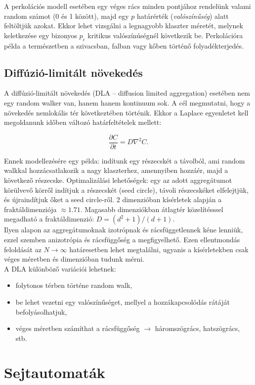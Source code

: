 \documentclass[12pt]{article}
\theoremstyle{plain}
\begin{document}
A perkolációs modell esetében egy véges rács minden pontjához rendelünk valami random számot (0 és 1 között), majd  egy $p$ határérték (\textit{valószínűség}) alatt feltöltjük azokat. Ekkor lehet vizsgálni a legnagyobb klaszter méretét, melynek keletkezése egy bizonyos $p_c$ kritikus valószínúségnél következik be. Perkolációra példa a természetben a szivacsban, falban vagy kőben történő folyadékterjedés. 

\subsection{Diffúzió-limitált növekedés}
A diffúzió-limitált növekedés (DLA -- diffusion limited aggregation) esetében nem egy random walker van, hanem hanem kontinuum sok. A cél megmutatni, hogy a növekedés nemlokális tér következtében történik. Ekkor a Laplace egyenletet kell megoldanunk időben változó határfeltételek mellett:

\begin{equation}
\frac{\partial C}{\partial t} = D \nabla^2 C.
\end{equation}

Ennek modellezésére egy példa: indítunk egy részecskét a távolból, ami random walkkal hozzácsatlakozik a nagy klaszterhez, amennyiben hozzáér, majd a következő részecske. Optimalizálási lehetőségek: egy az adott aggregátumot körülvevő körről indítjuk a részecskét (seed circle), távoli részecskéket elfelejtjük, és újraindítjuk őket a seed circle-ről. 2 dimenzióban kísérletek alapján a fraktáldimenziója $\approx 1.71$. Magasabb dimenziókban átlagtér közelítésssel megadható a fraktáldimenzió: $D = \left(d^2 + 1 \right)/\left( d+1\right)$. \\

Ilyen alapon az aggregátumoknak izotrópnak és rácsfüggetlennek kéne lenniük, ezzel szemben anizotrópia és rácsfüggőség a megfigyelhető. Ezen ellentmondás feloldását az $N \rightarrow \infty$ határesetben lehet megtalálni, ugyanis a kísérletekben csak véges méretben és dimenzióban tudunk mérni. \\

A DLA különböző variációi lehetnek:

\begin{itemize}
\item folytonos térben történe random walk,
\item be lehet vezetni egy valószínűséget, mellyel a hozzákapcsolódás rátáját befolyásolhatjuk,
\item véges méretben számíthat a rácsfüggőség $\rightarrow$ háromszögrács, hatszögrács, stb.
\end{itemize}


\section{Sejtautomaták}
\label{sec:cellular_automatons}










\end{document}

